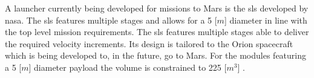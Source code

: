 A launcher currently being developed for missions to Mars is the \acrfull{sls} developed by \gls{nasa}. The \gls{sls} features multiple stages and allows for a 5 [$m$] diameter in line with the top level mission requirements. The \gls{sls} features multiple stages able to deliver the required velocity increments. Its design is tailored to the Orion spacecraft which is being developed to, in the future, go to Mars. For the modules featuring a 5 [$m$] diameter payload the volume is constrained to 225 [$m^3$] \cite{NASA2014}.


